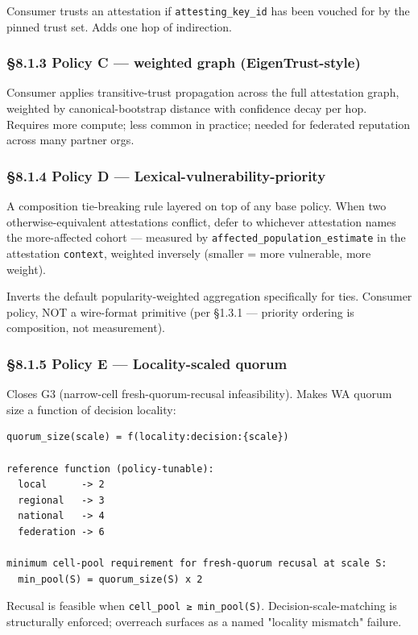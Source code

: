 \documentclass[10pt]{article}
\begin{document}
Consumer trusts an attestation if \texttt{attesting\_key\_id} has been vouched for by the pinned trust set. Adds one hop of indirection.


\subsubsection*{§8.1.3 Policy C — weighted graph (EigenTrust-style)}


Consumer applies transitive-trust propagation across the full attestation graph, weighted by canonical-bootstrap distance with confidence decay per hop. Requires more compute; less common in practice; needed for federated reputation across many partner orgs.


\subsubsection*{§8.1.4 Policy D — Lexical-vulnerability-priority}


A composition tie-breaking rule layered on top of any base policy. When two otherwise-equivalent attestations conflict, defer to whichever attestation names the more-affected cohort — measured by \texttt{affected\_population\_estimate} in the attestation \texttt{context}, weighted inversely (smaller = more vulnerable, more weight).


Inverts the default popularity-weighted aggregation specifically for ties. Consumer policy, NOT a wire-format primitive (per §1.3.1 — priority ordering is composition, not measurement).


\subsubsection*{§8.1.5 Policy E — Locality-scaled quorum}


Closes G3 (narrow-cell fresh-quorum-recusal infeasibility). Makes WA quorum size a function of decision locality:


\begin{lstlisting}
quorum_size(scale) = f(locality:decision:{scale})

reference function (policy-tunable):
  local      -> 2
  regional   -> 3
  national   -> 4
  federation -> 6

minimum cell-pool requirement for fresh-quorum recusal at scale S:
  min_pool(S) = quorum_size(S) x 2
\end{lstlisting}

Recusal is feasible when \texttt{cell\_pool ≥ min\_pool(S)}. Decision-scale-matching is structurally enforced; overreach surfaces as a named "locality mismatch" failure.
\end{document}
